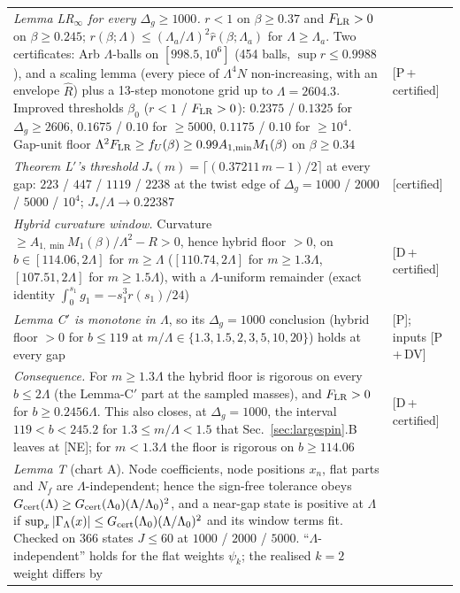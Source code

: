 \documentclass[aps,prl,onecolumn,superscriptaddress,nofootinbib]{revtex4-2}
\begin{document}
\begin{table}[!htbp]
\begin{ruledtabular}
\begin{tabular}{L{11.6cm}L{4.6cm}}
\emph{Lemma LR$_\infty$ for every $\Delta_g\ge1000$.} $r<1$ on $\beta\ge0.37$ and $F_{\rm LR}>0$ on $\beta\ge0.245$; $r(\beta;\Lambda)\le
(\Lambda_a/\Lambda)^2\hat r(\beta;\Lambda_a)$ for $\Lambda\ge\Lambda_a$. Two certificates: Arb $\Lambda$-balls on $[998.5,10^6]$ (454 balls,
$\sup r\le0.9988$), and a scaling lemma (every piece of $\Lambda^4N$ non-increasing, with an envelope $\hat R$) plus a 13-step
monotone grid up to $\Lambda=2604.3$. Improved thresholds $\beta_0$ ($r<1$ / $F_{\rm LR}>0$): $0.2375$ / $0.1325$ for $\Delta_g\ge2606$,
$0.1675$ / $0.10$ for $\ge5000$, $0.1175$ / $0.10$ for $\ge10^4$. Gap-unit floor $\Lambda^2F_{\rm LR}\ge f_U(\beta)\ge0.99A_{1,\min}M_1(\beta)$
on $\beta\ge0.34$ & [P\,+\,certified]\\
\emph{Theorem L$'$'s threshold} $J_*(m)=\lceil(0.37211\,m-1)/2\rceil$ at every gap: $223$ / $447$ / $1119$ / $2238$ at the twist edge
of $\Delta_g=1000$ / $2000$ / $5000$ / $10^4$; $J_*/\Lambda\to0.22387$ & [certified]\\
\emph{Hybrid curvature window.} Curvature $\ge A_{1,\min}M_1(\beta)/\Lambda^2-R>0$, hence hybrid floor $>0$, on $b\in[114.06,2\Lambda]$
for $m\ge\Lambda$ ($[110.74,2\Lambda]$ for $m\ge1.3\Lambda$, $[107.51,2\Lambda]$ for $m\ge1.5\Lambda$), with a $\Lambda$-uniform remainder
(exact identity $\int_0^{s_1}g_1=-s_1^3r(s_1)/24$) & [D\,+\,certified]\\
\emph{Lemma C$'$ is monotone in $\Lambda$}, so its $\Delta_g=1000$ conclusion (hybrid floor $>0$ for $b\le119$ at
$m/\Lambda\in\{1.3,1.5,2,3,5,10,20\}$) holds at every gap & [P]; inputs [P\,+\,DV]\\
\emph{Consequence.} For $m\ge1.3\Lambda$ the hybrid floor is rigorous on every $b\le2\Lambda$ (the Lemma-C$'$ part at the sampled masses),
and $F_{\rm LR}>0$ for $b\ge0.2456\Lambda$. This also closes, at $\Delta_g=1000$, the interval $119<b<245.2$ for $1.3\le m/\Lambda<1.5$
that Sec.~\ref{sec:largespin}.B leaves at [NE]; for $m<1.3\Lambda$ the floor is rigorous on $b\ge114.06$ & [D\,+\,certified]\\
\emph{Lemma T} (chart A). Node coefficients, node positions $x_n$, flat parts and $N_f$ are $\Lambda$-independent; hence the sign-free
tolerance obeys $G_{\rm cert}(\Lambda)\ge G_{\rm cert}(\Lambda_0)(\Lambda/\Lambda_0)^2$, and a near-gap state is positive at $\Lambda$ if
$\sup_x|\Gamma_\Lambda(x)|\le G_{\rm cert}(\Lambda_0)(\Lambda/\Lambda_0)^2$ and its window terms fit. Checked on 366 states $J\le60$ at
$1000$ / $2000$ / $5000$. ``$\Lambda$-independent'' holds for the flat weights $\psi_k$; the realised $k=2$ weight differs by

\end{tabular}
\end{ruledtabular}
\end{table}
\end{document}

